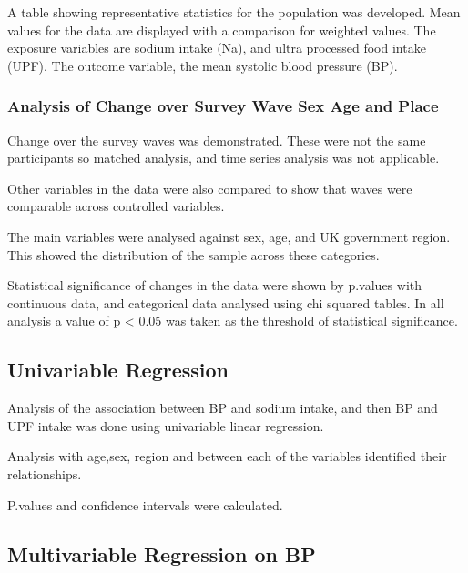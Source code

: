 \documentclass[
]{article}
\begin{document}
A table showing representative statistics for the population was
developed. Mean values for the data are displayed with a comparison for
weighted values. The exposure variables are sodium intake (Na), and
ultra processed food intake (UPF). The outcome variable, the mean
systolic blood pressure (BP).

\hypertarget{analysis-of-change-over-survey-wave-sex-age-and-place}{%
\subsubsection{Analysis of Change over Survey Wave Sex Age and
Place}\label{analysis-of-change-over-survey-wave-sex-age-and-place}}

Change over the survey waves was demonstrated. These were not the same
participants so matched analysis, and time series analysis was not
applicable.

Other variables in the data were also compared to show that waves were
comparable across controlled variables.

The main variables were analysed against sex, age, and UK government
region. This showed the distribution of the sample across these
categories.

Statistical significance of changes in the data were shown by p.values
with continuous data, and categorical data analysed using chi squared
tables. In all analysis a value of p \textless{} 0.05 was taken as the
threshold of statistical significance.

\hypertarget{univariable-regression}{%
\subsection{Univariable Regression}\label{univariable-regression}}

Analysis of the association between BP and sodium intake, and then BP
and UPF intake was done using univariable linear regression.

Analysis with age,sex, region and between each of the variables
identified their relationships.

P.values and confidence intervals were calculated.

\hypertarget{multivariable-regression-on-bp}{%
\subsection{Multivariable Regression on
BP}\label{multivariable-regression-on-bp}}
\end{document}
